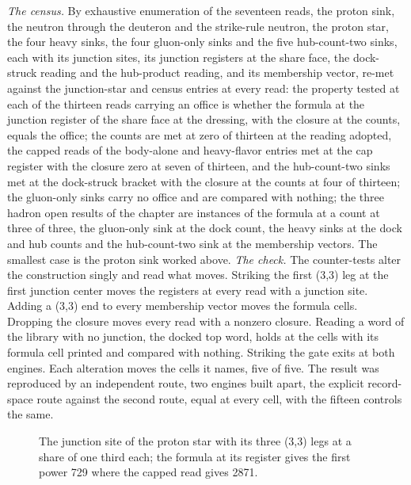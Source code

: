\begin{chproof}
\textit{The census.} By exhaustive enumeration of the seventeen reads, the proton sink, the neutron through the deuteron and the strike-rule neutron, the proton star, the four heavy sinks, the four gluon-only sinks and the five hub-count-two sinks, each with its junction sites, its junction registers at the share face, the dock-struck reading and the hub-product reading, and its membership vector, re-met against the junction-star and census entries at every read: the property tested at each of the thirteen reads carrying an office is whether the formula at the junction register of the share face at the dressing, with the closure at the counts, equals the office; the counts are met at zero of thirteen at the reading adopted, the capped reads of the body-alone and heavy-flavor entries met at the cap register with the closure zero at seven of thirteen, and the hub-count-two sinks met at the dock-struck bracket with the closure at the counts at four of thirteen; the gluon-only sinks carry no office and are compared with nothing; the three hadron open results of the chapter are instances of the formula at a count at three of three, the gluon-only sink at the dock count, the heavy sinks at the dock and hub counts and the hub-count-two sink at the membership vectors. The smallest case is the proton sink worked above.
\textit{The check.} The counter-tests alter the construction singly and read what moves. Striking the first (3,3) leg at the first junction center moves the registers at every read with a junction site. Adding a (3,3) end to every membership vector moves the formula cells. Dropping the closure moves every read with a nonzero closure. Reading a word of the library with no junction, the docked top word, holds at the cells with its formula cell printed and compared with nothing. Striking the gate exits at both engines. Each alteration moves the cells it names, five of five. The result was reproduced by an independent route, two engines built apart, the explicit record-space route against the second route, equal at every cell, with the fifteen controls the same.
\begin{figure}[h]\centering{}\caption{The junction site of the proton star with its three (3,3) legs at a share of one third each; the formula at its register gives the first power 729 where the capped read gives 2871.}\end{figure}
\end{chproof}
\par\medskip{}\label{narr:close:7-6}\par
